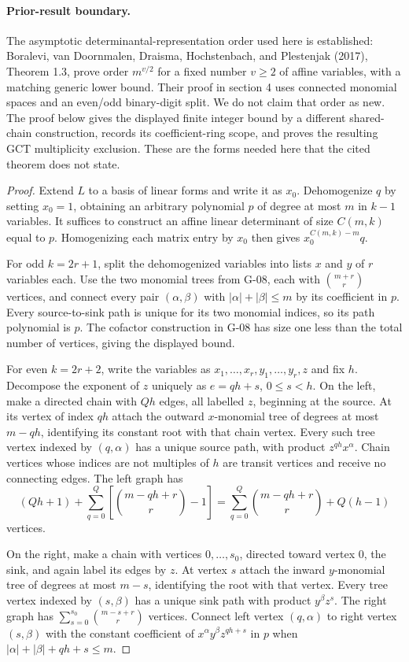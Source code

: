 \paragraph{Prior-result boundary.}
The asymptotic determinantal-representation order used here is established: Boralevi, van Doornmalen, Draisma, Hochstenbach, and Plestenjak (2017), Theorem 1.3, prove order $m^{v/2}$ for a fixed number $v\geq2$ of affine variables, with a matching generic lower bound. Their proof in section 4 uses connected monomial spaces and an even/odd binary-digit split. We do not claim that order as new. The proof below gives the displayed finite integer bound by a different shared-chain construction, records its coefficient-ring scope, and proves the resulting GCT multiplicity exclusion. These are the forms needed here that the cited theorem does not state.
\begin{proof}
Extend $L$ to a basis of linear forms and write it as $x_0$. Dehomogenize $q$ by setting $x_0=1$, obtaining an arbitrary polynomial $p$ of degree at most $m$ in $k-1$ variables. It suffices to construct an affine linear determinant of size $C(m,k)$ equal to $p$. Homogenizing each matrix entry by $x_0$ then gives $x_0^{C(m,k)-m}q$.

For odd $k=2r+1$, split the dehomogenized variables into lists $x$ and $y$ of $r$ variables each. Use the two monomial trees from G-08, each with $\binom{m+r}{r}$ vertices, and connect every pair $(\alpha,\beta)$ with $|\alpha|+|\beta|\leq m$ by its coefficient in $p$. Every source-to-sink path is unique for its two monomial indices, so its path polynomial is $p$. The cofactor construction in G-08 has size one less than the total number of vertices, giving the displayed bound.

For even $k=2r+2$, write the variables as $x_1,\ldots,x_r,y_1,\ldots,y_r,z$ and fix $h$. Decompose the exponent of $z$ uniquely as $e=qh+s$, $0\leq s<h$. On the left, make a directed chain with $Qh$ edges, all labelled $z$, beginning at the source. At its vertex of index $qh$ attach the outward $x$-monomial tree of degrees at most $m-qh$, identifying its constant root with that chain vertex. Every such tree vertex indexed by $(q,\alpha)$ has a unique source path, with product $z^{qh}x^\alpha$. Chain vertices whose indices are not multiples of $h$ are transit vertices and receive no connecting edges. The left graph has
\[
 (Qh+1)+\sum_{q=0}^Q\left[\binom{m-qh+r}{r}-1\right]
 =\sum_{q=0}^Q\binom{m-qh+r}{r}+Q(h-1)
\]
vertices.

On the right, make a chain with vertices $0,\ldots,s_0$, directed toward vertex $0$, the sink, and again label its edges by $z$. At vertex $s$ attach the inward $y$-monomial tree of degrees at most $m-s$, identifying the root with that vertex. Every tree vertex indexed by $(s,\beta)$ has a unique sink path with product $y^\beta z^s$. The right graph has $\sum_{s=0}^{s_0}\binom{m-s+r}{r}$ vertices. Connect left vertex $(q,\alpha)$ to right vertex $(s,\beta)$ with the constant coefficient of $x^\alpha y^\beta z^{qh+s}$ in $p$ when $|\alpha|+|\beta|+qh+s\leq m$.


\end{proof}
